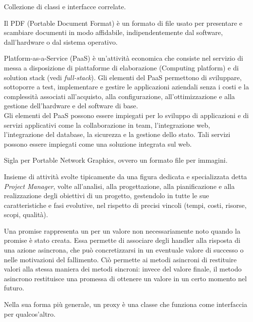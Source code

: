 Collezione di classi e interfacce correlate.

Il PDF (Portable Document Format) è un formato di file usato per presentare e scambiare documenti in modo affidabile, indipendentemente dal software, dall'hardware o dal sistema operativo.

Platform-as-a-Service (PaaS) è un'attività economica che consiste nel servizio di messa a disposizione di piattaforme di elaborazione (Computing platform) e di solution stack (vedi \textit{full-stack}). Gli elementi del PaaS permettono di sviluppare, sottoporre a test, implementare e gestire le applicazioni aziendali senza i costi e la complessità associati all'acquisto, alla configurazione, all'ottimizzazione e alla gestione dell'hardware e del software di base.\\
Gli elementi del PaaS possono essere impiegati per lo sviluppo di applicazioni e di servizi applicativi come la collaborazione in team, l'integrazione web, l'integrazione del database, la sicurezza e la gestione dello stato. Tali servizi possono essere impiegati come una soluzione integrata sul web.

Sigla per Portable Network Graphics, ovvero un formato file per immagini.

Insieme di attività svolte tipicamente da una figura dedicata e specializzata detta \textit{Project Manager}, volte all'analisi, alla progettazione, alla pianificazione e alla realizzazione degli obiettivi di un progetto, gestendolo in tutte le sue caratteristiche e fasi evolutive, nel rispetto di precisi vincoli (tempi, costi, risorse, scopi, qualità).

Una promise rappresenta un  per un valore non necessariamente noto quando la promise è stato creata. Essa permette di associare degli handler alla risposta di una azione asincrona, che può concretizzarsi in un eventuale valore di successo o nelle motivazioni del fallimento. Ciò permette ai metodi asincroni di restituire valori alla stessa maniera dei metodi sincroni: invece del valore finale, il metodo asincrono restituisce una promessa di ottenere un valore in un certo momento nel futuro.

Nella sua forma più generale, un proxy è una classe che funziona come interfaccia per qualcos'altro.
\clearpage
